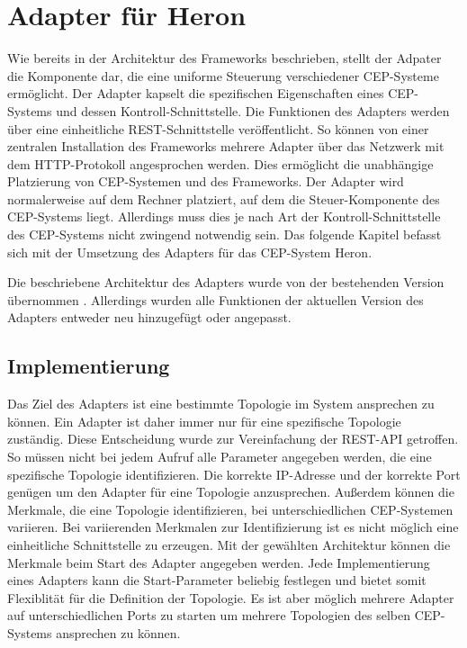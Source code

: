 \chapter{Adapter für Heron}

Wie bereits in der Architektur des Frameworks beschrieben, stellt der Adpater die Komponente dar, die eine uniforme Steuerung verschiedener CEP-Systeme ermöglicht.
Der Adapter kapselt die spezifischen Eigenschaften eines CEP-Systems und dessen Kontroll-Schnittstelle.
Die Funktionen des Adapters werden über eine einheitliche REST-Schnittstelle veröffentlicht.
So können von einer zentralen Installation des Frameworks mehrere Adapter über das Netzwerk mit dem HTTP-Protokoll angesprochen werden.
Dies ermöglicht die unabhängige Platzierung von CEP-Systemen und des Frameworks.
Der Adapter wird normalerweise auf dem Rechner platziert, auf dem die Steuer-Komponente des CEP-Systems liegt.
Allerdings muss dies je nach Art der Kontroll-Schnittstelle des CEP-Systems nicht zwingend notwendig sein.
Das folgende Kapitel befasst sich mit der Umsetzung des Adapters für das CEP-System Heron.

Die beschriebene Architektur des Adapters wurde von der bestehenden Version übernommen \cite{goggel_vergleich_2018}.
Allerdings wurden alle Funktionen der aktuellen Version des Adapters entweder neu hinzugefügt oder angepasst.

\section{Implementierung}

Das Ziel des Adapters ist eine bestimmte Topologie im System ansprechen zu können.
Ein Adapter ist daher immer nur für eine spezifische Topologie zuständig.
Diese Entscheidung wurde zur Vereinfachung der REST-API getroffen.
So müssen nicht bei jedem Aufruf alle Parameter angegeben werden, die eine spezifische Topologie identifizieren.
Die korrekte IP-Adresse und der korrekte Port genügen um den Adapter für eine Topologie anzusprechen.
Außerdem können die Merkmale, die eine Topologie identifizieren, bei unterschiedlichen CEP-Systemen variieren.
Bei variierenden Merkmalen zur Identifizierung ist es nicht möglich eine einheitliche Schnittstelle zu erzeugen.
Mit der gewählten Architektur können die Merkmale beim Start des Adapter angegeben werden.
Jede Implementierung eines Adapters kann die Start-Parameter beliebig festlegen und bietet somit Flexiblität für die Definition der Topologie.
Es ist aber möglich mehrere Adapter auf unterschiedlichen Ports zu starten um mehrere Topologien des selben CEP-Systems ansprechen zu können.

